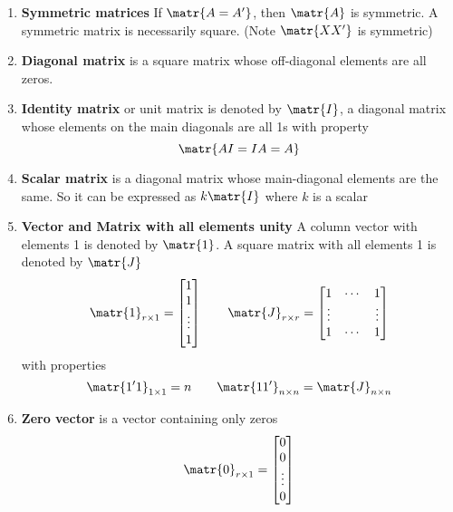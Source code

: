 \documentclass[11pt]{article}
\begin{document}
\begin{defn*}
\begin{enumerate}
        \begin{enumerate}
            \item \textbf{Symmetric matrices} If $\matr{A = A'}$, then $\matr{A}$ is symmetric. A symmetric matrix is necessarily square. (Note $\matr{XX'}$ is symmetric)
            \item \textbf{Diagonal matrix} is a square matrix whose off-diagonal elements are all zeros. 
            \item \textbf{Identity matrix} or unit matrix is denoted by $\matr{I}$, a diagonal matrix whose elements on the main diagonals are all 1s with property 
            \[
                \matr{AI = IA = A}
            \]
            \item \textbf{Scalar matrix} is a diagonal matrix whose main-diagonal elements are the same. So it can be expressed as $k\matr{I}$ where $k$ is a scalar
            \item \textbf{Vector and Matrix with all elements unity} A column vector with elements 1 is denoted by $\matr{1}$. A square matrix with all elements 1 is denoted by $\matr{J}$
            \[
                \matr{1}_{r\times 1} =
                \begin{bmatrix}
                    1 \\ 1 \\ \vdots \\ 1
                \end{bmatrix}
                \quad \quad 
                \matr{J}_{r\times r} = 
                \begin{bmatrix}
                    1 & \cdots & 1 \\
                    \vdots & & \vdots \\
                    1 & \cdots & 1 \\ 
                \end{bmatrix}
            \]
            with properties 
            \[
                \matr{1' 1}_{1\times 1} = n \quad \quad 
                \matr{1 1'}_{n\times n} = \matr{J}_{n\times n}
            \]
            \item \textbf{Zero vector} is a vector containing only zeros 
            \[
                \matr{0}_{r\times 1} = 
                \begin{bmatrix}
                    0 \\ 0 \\ \vdots \\ 0
                \end{bmatrix}
\]
\end{enumerate}
\end{enumerate}
\end{defn*}
\end{document}
